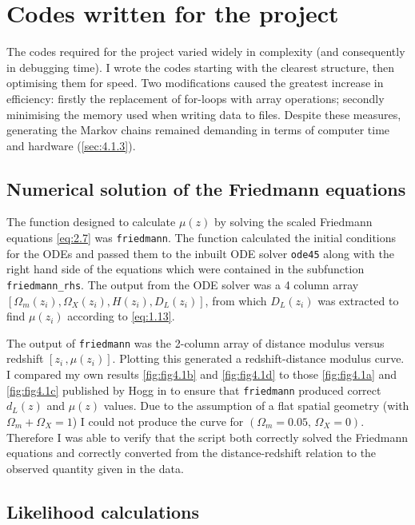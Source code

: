 \section{Codes written for the project}
\label{sec:codes-written}

The codes required for the project varied widely in complexity (and consequently in debugging time). I wrote the codes starting with the clearest structure, then optimising them for speed. Two modifications caused the greatest increase in efficiency: firstly the replacement of for-loops with array operations; secondly minimising the memory used when writing data to files. Despite these measures, generating the Markov chains remained demanding in terms of computer time and hardware (\cref{sec:4.1.3}).

\subsection{Numerical solution of the Friedmann equations}
\label{sec:4.1.1}

The function designed to calculate $\mu(z)$ by solving the scaled Friedmann equations \cref{eq:2.7} was \texttt{friedmann}. The function calculated the initial conditions for the ODEs and passed them to the inbuilt \matlab{} ODE solver \texttt{ode45} along with the right hand side of the equations which were contained in the subfunction \texttt{friedmann\_rhs}. The output from the ODE solver was a 4 column array $\left[ \Omega_m (z_i), \Omega_X (z_i), H(z_i), D_L(z_i)\right]$, from which $D_L(z_i)$ was extracted to find $\mu(z_i)$ according to \cref{eq:1.13}.

The output of \texttt{friedmann} was the 2-column array of distance modulus versus redshift $[z_i \,, \mu(z_i)]$. Plotting this generated a redshift-distance modulus curve. I compared my own results \cref{fig:fig4.1b} and \cref{fig:fig4.1d} to those \cref{fig:fig4.1a} and \cref{fig:fig4.1c} published by Hogg in \cite{Hogg2000} to ensure that \texttt{friedmann} produced correct $d_L(z)$ and $\mu(z)$ values. Due to the assumption of a flat spatial geometry (with $\Omega_m + \Omega_X = 1$) I could not produce the curve for $(\Omega_m = 0.05, \, \Omega_X = 0)$. Therefore I was able to verify that the script both correctly solved the Friedmann equations and correctly converted from the distance-redshift relation to the observed quantity given in the data.

\subsection{Likelihood calculations}
\label{sec:4.1.2}

